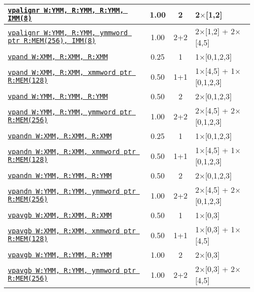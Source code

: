 \documentclass[a4paper,english,fontsize=9]{scrartcl}
\begin{document}
\begin{longtable}{p{}ccL{.25\textwidth}}
  \midrule
  \texttt{\href{https://felixcloutier.com/x86/PALIGNR.html}{vpalignr W:YMM, R:YMM, R:YMM, IMM(8)}} & 1.00 & 2 & 2\(\times\)[1,2] \\
  \midrule
  \texttt{\href{https://felixcloutier.com/x86/PALIGNR.html}{vpalignr W:YMM, R:YMM, ymmword ptr R:MEM(256), IMM(8)}} & 1.00 & 2+2 & 2\(\times\)[1,2] + 2\(\times\)[4,5] \\
  \midrule
  \texttt{\href{https://felixcloutier.com/x86/PAND.html}{vpand W:XMM, R:XMM, R:XMM}} & 0.25 & 1 & 1\(\times\)[0,1,2,3] \\
  \midrule
  \texttt{\href{https://felixcloutier.com/x86/PAND.html}{vpand W:XMM, R:XMM, xmmword ptr R:MEM(128)}} & 0.50 & 1+1 & 1\(\times\)[4,5] + 1\(\times\)[0,1,2,3] \\
  \midrule
  \texttt{\href{https://felixcloutier.com/x86/PAND.html}{vpand W:YMM, R:YMM, R:YMM}} & 0.50 & 2 & 2\(\times\)[0,1,2,3] \\
  \midrule
  \texttt{\href{https://felixcloutier.com/x86/PAND.html}{vpand W:YMM, R:YMM, ymmword ptr R:MEM(256)}} & 1.00 & 2+2 & 2\(\times\)[4,5] + 2\(\times\)[0,1,2,3] \\
  \midrule
  \texttt{\href{https://felixcloutier.com/x86/PANDN.html}{vpandn W:XMM, R:XMM, R:XMM}} & 0.25 & 1 & 1\(\times\)[0,1,2,3] \\
  \midrule
  \texttt{\href{https://felixcloutier.com/x86/PANDN.html}{vpandn W:XMM, R:XMM, xmmword ptr R:MEM(128)}} & 0.50 & 1+1 & 1\(\times\)[4,5] + 1\(\times\)[0,1,2,3] \\
  \midrule
  \texttt{\href{https://felixcloutier.com/x86/PANDN.html}{vpandn W:YMM, R:YMM, R:YMM}} & 0.50 & 2 & 2\(\times\)[0,1,2,3] \\
  \midrule
  \texttt{\href{https://felixcloutier.com/x86/PANDN.html}{vpandn W:YMM, R:YMM, ymmword ptr R:MEM(256)}} & 1.00 & 2+2 & 2\(\times\)[4,5] + 2\(\times\)[0,1,2,3] \\
  \midrule
  \texttt{\href{https://felixcloutier.com/x86/PAVGB:PAVGW.html}{vpavgb W:XMM, R:XMM, R:XMM}} & 0.50 & 1 & 1\(\times\)[0,3] \\
  \midrule
  \texttt{\href{https://felixcloutier.com/x86/PAVGB:PAVGW.html}{vpavgb W:XMM, R:XMM, xmmword ptr R:MEM(128)}} & 0.50 & 1+1 & 1\(\times\)[0,3] + 1\(\times\)[4,5] \\
  \midrule
  \texttt{\href{https://felixcloutier.com/x86/PAVGB:PAVGW.html}{vpavgb W:YMM, R:YMM, R:YMM}} & 1.00 & 2 & 2\(\times\)[0,3] \\
  \midrule
  \texttt{\href{https://felixcloutier.com/x86/PAVGB:PAVGW.html}{vpavgb W:YMM, R:YMM, ymmword ptr R:MEM(256)}} & 1.00 & 2+2 & 2\(\times\)[0,3] + 2\(\times\)[4,5] \\

\end{longtable}
\end{document}
